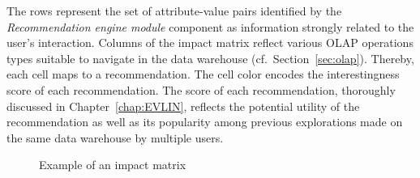 The rows represent the set of attribute-value pairs identified by the \emph{Recommendation engine module} component  as information strongly related to the user's interaction.
Columns of the impact matrix reflect various OLAP operations types suitable to navigate in the data warehouse (cf.~Section~\ref{sec:olap}).
Thereby, each cell maps to a recommendation.
The cell color encodes the interestingness score of each recommendation. The score of each recommendation, thoroughly discussed in Chapter~\ref{chap:EVLIN}, reflects the potential utility of the recommendation as well as its popularity among previous explorations made on the same data warehouse by multiple users.


\begin{figure}[b]
\centering
\caption{Example of an impact matrix}
\label{fig:matrixSample}
\end{figure}

